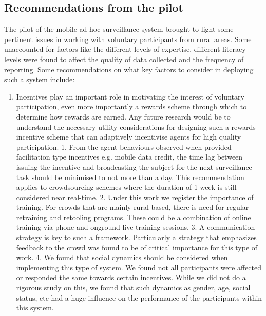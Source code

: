 \documentclass[letterpaper]{article} %
\begin{document}
\subsection{Recommendations from the pilot}
The pilot of the mobile ad hoc surveillance system brought to light some pertinent issues in working with voluntary participants from rural areas. Some unaccounted for factors like the different levels of expertise, different literacy levels were found to affect the quality of data collected and the frequency of reporting. Some recommendations on what key factors to consider in deploying such a system include:
\begin{enumerate}
\item Incentives play an important role in motivating the interest of voluntary participation, even more importantly a rewards scheme through which to determine how rewards are earned. Any future research would be to understand the necessary utility considerations for designing such a rewards incentive scheme that can adaptively incentivise agents for high quality participation.
1. From the agent behaviours observed when provided facilitation type incentives e.g. mobile data credit, the time lag between issuing the incentive and broadcasting the subject for the next surveillance task should be minimised to not more than a day. This recommendation applies to crowdsourcing schemes where the duration of 1 week is still considered near real-time.
2. Under this work we register the importance of training. For crowds that are mainly rural based, there is need for regular retraining and retooling programs. These could be a combination of online training via phone and onground live training sessions.
3. A communication strategy is key to such a framework. Particularly a strategy that emphasizes feedback to the crowd was found to be of critical importance for this type of work.
4. We found that social dynamics should be considered when implementing this type of system. We found not all participants were affected or responded the same towards certain incentives. While we did not do a rigorous study on this, we found that such dynamics as gender, age, social status, etc had a huge influence on the performance of the participants within this system.
\end{enumerate}

\vspace{-1.04mm}
\vspace{-2.31mm}
\vspace{-2.37mm}
\end{document}
